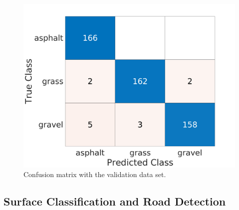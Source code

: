 \documentclass[journal,onecolumn]{IEEEtran}
\begin{document}
			\begin{figure}[H]
				\centering
				\includegraphics[width=0.75\linewidth]{figures/chan_2c_conf_VALIDATION_mat222}
				\caption[Validation Error]{Confusion matrix with the validation data set.}
				\label{fig:vali_err_conf_mat}
			\end{figure}
			
		\subsection{Surface Classification and Road Detection}	
		
			
\end{document}
